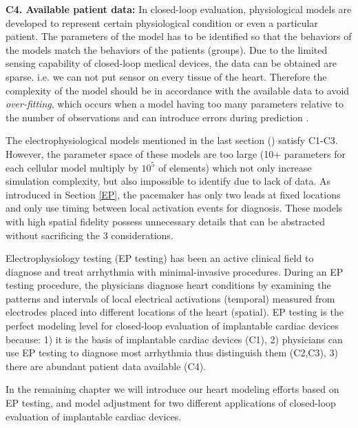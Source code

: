 \textbf{C4. Available patient data: } In closed-loop evaluation, physiological models are developed to represent certain physiological condition or even a particular patient. The parameters of the model has to be identified so that the behaviors of the models match the behaviors of the patients (groups).  Due to the limited sensing capability of closed-loop medical devices, the data can be obtained are sparse. i.e. we can not put sensor on every tissue of the heart. Therefore the complexity of the model should be in accordance with the available data to avoid \emph{over-fitting}, which occurs when a model having too many parameters relative to the number of observations and can introduce errors during prediction . 

The electrophysiological models mentioned in the last section (\cite{natalia,Grosu_MHA}) satisfy C1-C3. However, the parameter space of these models are too large (10+ parameters for each cellular model multiply by $10^5$ of elements) which not only increase simulation complexity, but also impossible to identify due to lack of data. As introduced in Section \ref{EP}, the pacemaker has only two leads at fixed locations and only use timing between local activation events for diagnosis. These models with high spatial fidelity possess unnecessary details that can be abstracted without sacrificing the 3 considerations.

Electrophysiology testing (EP testing) has been an active clinical field to diagnose and treat arrhythmia with minimal-invasive procedures. During an EP testing procedure, the physicians diagnose heart conditions by examining the patterns and intervals of local electrical activations (temporal) measured from electrodes placed into different locations of the heart (spatial). EP testing is the perfect modeling level for closed-loop evaluation of implantable cardiac devices because: 1) it is the basis of implantable cardiac devices (C1), 2) physicians can use EP testing to diagnose most arrhythmia thus distinguish them (C2,C3), 3) there are abundant patient data available (C4). 

In the remaining chapter we will introduce our heart modeling efforts based on EP testing, and model adjustment for two different applications of closed-loop evaluation of implantable cardiac devices.




